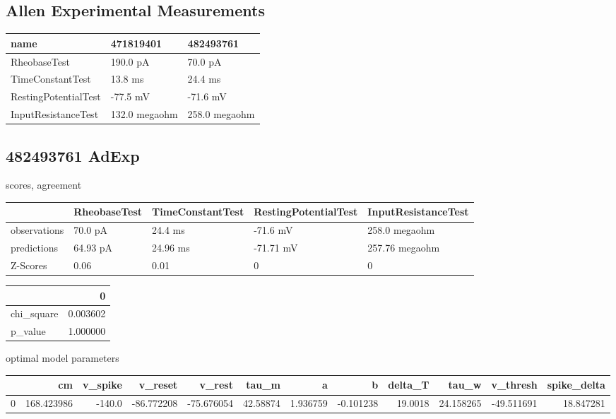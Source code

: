 \subsection{Allen Experimental Measurements}\begin{tabular}{lll}
\toprule
name &      471819401 &      482493761 \\
\midrule
RheobaseTest         &       190.0 pA &        70.0 pA \\
TimeConstantTest     &        13.8 ms &        24.4 ms \\
RestingPotentialTest &       -77.5 mV &       -71.6 mV \\
InputResistanceTest  &  132.0 megaohm &  258.0 megaohm \\
\bottomrule
\end{tabular}
\subsection{482493761 AdExp} scores, agreement\begin{tabular}{lllll}
\toprule
{} & RheobaseTest & TimeConstantTest & RestingPotentialTest & InputResistanceTest \\
\midrule
observations &      70.0 pA &          24.4 ms &             -71.6 mV &       258.0 megaohm \\
predictions  &     64.93 pA &         24.96 ms &            -71.71 mV &      257.76 megaohm \\
Z-Scores     &         0.06 &             0.01 &                    0 &                   0 \\
\bottomrule
\end{tabular}
\begin{tabular}{lr}
\toprule
{} &         0 \\
\midrule
chi\_square &  0.003602 \\
p\_value    &  1.000000 \\
\bottomrule
\end{tabular}
optimal model parameters\begin{tabular}{lrrrrrrrrrrr}
\toprule
{} &          cm &  v\_spike &    v\_reset &     v\_rest &     tau\_m &         a &         b &  delta\_T &      tau\_w &   v\_thresh &  spike\_delta \\
\midrule
0 &  168.423986 &   -140.0 & -86.772208 & -75.676054 &  42.58874 &  1.936759 & -0.101238 &  19.0018 &  24.158265 & -49.511691 &    18.847281 \\
\bottomrule
\end{tabular}
